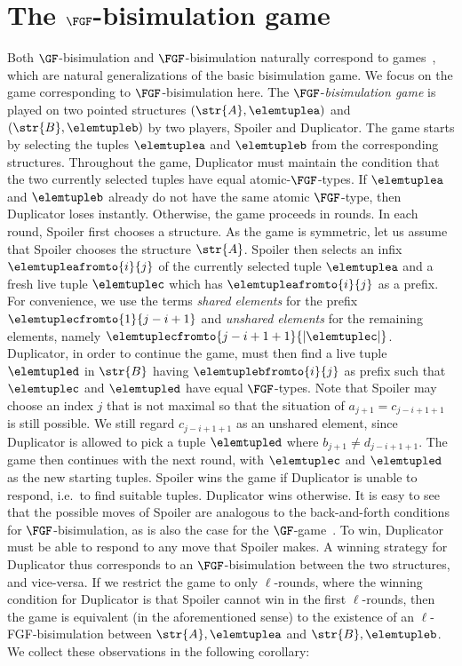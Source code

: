 \section{The $\FGF$-bisimulation game}\label{sec:fgf-game}
Both $\GF$-bisimulation and $\FGF$-bisimulation naturally correspond to games~\cite[Sec. 1.2.1]{Gradel014}, which are natural generalizations of the basic bisimulation game.
We focus on the game corresponding to $\FGF$-bisimulation here.
The $\FGF$-\emph{bisimulation game} is played on two pointed structures $(\str{A}, \elemtuplea)$ and $(\str{B}, \elemtupleb)$ by two players, Spoiler and Duplicator.
The game starts by selecting the tuples $\elemtuplea$ and $\elemtupleb$ from the corresponding structures.
Throughout the game, Duplicator must maintain the condition that the two currently selected tuples have equal atomic-$\FGF$-types.
If $\elemtuplea$ and $\elemtupleb$ already do not have the same atomic $\FGF$-type, then Duplicator loses instantly.
Otherwise, the game proceeds in rounds.
In each round, Spoiler first chooses a structure.
As the game is symmetric, let us assume that Spoiler chooses the structure $\str{A}$.
Spoiler then selects an infix $\elemtupleafromto{i}{j}$ of the currently selected tuple $\elemtuplea$ and a fresh live tuple $\elemtuplec$ which has $\elemtupleafromto{i}{j}$ as a prefix.
For convenience, we use the terms \emph{shared elements} for the prefix $\elemtuplecfromto{1}{j-i+1}$ and \emph{unshared elements} for the remaining elements, namely $\elemtuplecfromto{j-i+1+1}{|\elemtuplec|}$.
Duplicator, in order to continue the game, must then find a live tuple $\elemtupled$ in $\str{B}$ having $\elemtuplebfromto{i}{j}$ as prefix such that $\elemtuplec$ and $\elemtupled$ have equal $\FGF$-types.
Note that Spoiler may choose an index $j$ that is not maximal so that the situation of $a_{j+1} = c_{j-i+1+1}$ is still possible.
We still regard $c_{j-i+1+1}$ as an unshared element, since Duplicator is allowed to pick a tuple $\elemtupled$ where $b_{j+1} \neq d_{j-i+1+1}$.
The game then continues with the next round, with $\elemtuplec$ and $\elemtupled$ as the new starting tuples.
Spoiler wins the game if Duplicator is unable to respond, i.e.\ to find suitable tuples.
Duplicator wins otherwise.
It is easy to see that the possible moves of Spoiler are analogous to the back-and-forth conditions for $\FGF$-bisimulation, as is also the case for the $\GF$-game~\cite[Sec.\ 1.3.2]{Gradel014}.
To win, Duplicator must be able to respond to any move that Spoiler makes.
A winning strategy for Duplicator thus corresponds to an $\FGF$-bisimulation between the two structures, and vice-versa.
If we restrict the game to only $\ell$-rounds, where the winning condition for Duplicator is that Spoiler cannot win in the first $\ell$-rounds, then the game is equivalent (in the aforementioned sense) to the existence of an $\ell$-FGF-bisimulation between $\str{A}, \elemtuplea$ and $\str{B}, \elemtupleb$.
We collect these observations in the following corollary:

